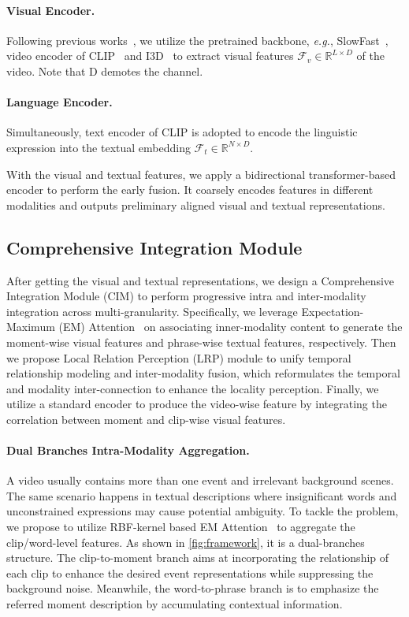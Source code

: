 \documentclass[10pt,twocolumn,letterpaper]{article}
\begin{document}
\paragraph{Visual Encoder.} Following previous works~\cite{momentdetr,umt,qddetr,univtg}, we utilize the pretrained backbone, \textit{e.g.}, SlowFast~\cite{slowfast}, video encoder of CLIP~\cite{clip} and I3D~\cite{i3d} to extract visual features $\mathcal{F}_v \in \mathbb{R}^{L \times D}$ of the video. Note that D demotes the channel.
\vspace{-12pt}
\paragraph{Language Encoder.} Simultaneously, text encoder of CLIP is adopted to encode the linguistic expression into the textual embedding $\mathcal{F}_{t} \in \mathbb{R}^{N \times D}$.
 
With the visual and textual features, we apply a bidirectional transformer-based encoder to perform the early fusion.
It coarsely encodes features in different modalities and outputs preliminary aligned visual and textual representations.  

\subsection{Comprehensive Integration Module}
\label{sec:cim}
After getting the visual and textual representations, we design a Comprehensive Integration Module (CIM) to perform progressive intra and inter-modality integration across multi-granularity. 
Specifically, we leverage Expectation-Maximum (EM) Attention~\cite{em} on associating inner-modality content to generate the moment-wise visual features and phrase-wise textual features, respectively. 
Then we propose Local Relation Perception (LRP) module to unify temporal relationship modeling and inter-modality fusion, which reformulates the temporal and modality inter-connection to enhance the locality perception.
Finally, we utilize a standard encoder to produce the video-wise feature by integrating the correlation between moment and clip-wise visual features.
\vspace{-10pt}
\paragraph{Dual Branches Intra-Modality Aggregation.} A video usually contains more than one event and irrelevant background scenes.
The same scenario happens in textual descriptions where insignificant words and unconstrained expressions may cause potential ambiguity. 
To tackle the problem, we propose to utilize RBF-kernel based EM Attention~\cite{em,rskp} to aggregate the clip/word-level features. 
As shown in \cref{fig:framework}, it is a dual-branches structure.
The clip-to-moment branch aims at incorporating the relationship of each clip to enhance the desired event representations while suppressing the background noise.
Meanwhile, the word-to-phrase branch is to emphasize the referred moment description by accumulating contextual information.
\end{document}
